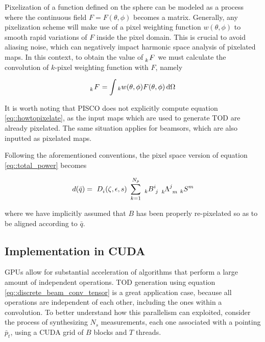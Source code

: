 \documentclass[a4paper,11pt]{article}
\begin{document}
Pixelization of a function defined on the sphere can be modeled as a process where the continuous field $F = F(\theta,\phi)$ becomes a matrix. Generally, any pixelization scheme will make use of a pixel weighting function $w(\theta,\phi)$ to smooth rapid variations of $F$ inside the pixel domain. This is crucial to avoid aliasing noise, which can negatively impact harmonic space analysis of pixelated maps. In this context, to obtain the value of $\tensor[_k]{F}{}$ we must calculate the convolution of $k$-pixel weighting function with $F$, namely 

\begin{equation}
\begin{aligned}
\tensor[_k]{F}{} = \int {}_k w (\theta,\phi) F(\theta,\phi) \, \mathrm{d} \Omega
\end{aligned}
\label{eq::howtopixelate}
\end{equation}

\noindent
It is worth noting that PISCO does not explicitly compute equation \ref{eq::howtopixelate}, as the input maps which are used to generate TOD are already pixelated. The same situation applies for beamsors, which are also inputted as pixelated maps.

Following the aforementioned conventions, the pixel space version of equation \ref{eq::total_power} becomes

\begin{equation}
\begin{aligned}
d(\bar{q}) = \
\tensor{D}{_{i}}(\zeta,\epsilon,s) \
\sum_{k=1}^{N_p} \
\tensor[_k]{B}{^i_j} \
\tensor[_k]{\Lambda}{^j_m} \
\tensor[_k]{S}{^m}
\end{aligned}
\label{eq::discrete_beam_conv_tensor}
\end{equation}

\noindent
where we have implicitly assumed that $B$ has been properly re-pixelated so as to be aligned according to $\bar{q}$. 

\subsection{Implementation in CUDA}

GPUs allow for substantial acceleration of algorithms that perform a large amount of independent operations\cite{sanders2010cuda}. TOD generation using equation \ref{eq::discrete_beam_conv_tensor} is a great application case, because all operations are independent of each other, including the ones within a convolution. To better understand how this parallelism can exploited, consider the process of synthesizing $N_s$ measurements, each one associated with a pointing $\bar{p}_t$, using a CUDA grid of $B$ blocks and $T$ threads.
\end{document}
